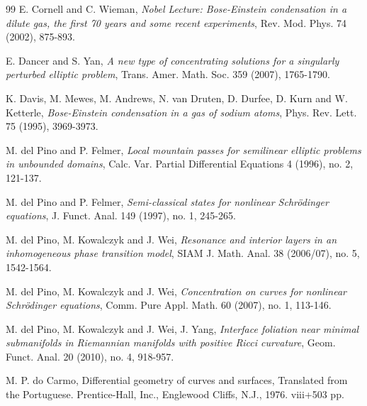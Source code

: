 \documentclass[10pt, reqno]{amsart}
\numberwithin{equation}{section}
\theoremstyle{definition}
\begin{document}
{\begin{thebibliography}{99}
E. Cornell and C. Wieman,
\emph{Nobel Lecture: Bose-Einstein condensation in a dilute gas, the first 70 years and some recent experiments},
Rev. Mod. Phys.
74 (2002), 875-893.



E. Dancer and S. Yan,
\emph{A new type of concentrating solutions for a singularly perturbed elliptic problem},
Trans. Amer. Math. Soc.
359 (2007), 1765-1790.

K. Davis, M. Mewes, M. Andrews, N. van Druten, D. Durfee, D. Kurn and W. Ketterle,
\emph{Bose-Einstein condensation in a gas of sodium atoms},
Phys. Rev. Lett.
75 (1995), 3969-3973.



M. del Pino and P. Felmer,
\emph{Local mountain passes for semilinear elliptic problems in unbounded domains},
Calc. Var. Partial Differential Equations
4 (1996), no. 2, 121-137.




M. del Pino and P. Felmer,
\emph{Semi-classical states for nonlinear Schr\"odinger equations},
J. Funct. Anal.
149 (1997), no. 1, 245-265.




M. del Pino, M. Kowalczyk and J. Wei,
\emph{Resonance and interior layers in an inhomogeneous phase transition model},
SIAM J. Math. Anal. 38 (2006/07), no. 5, 1542-1564.



M. del Pino, M. Kowalczyk and J. Wei,
\emph{Concentration on curves for nonlinear Schr\"odinger equations},
Comm. Pure Appl. Math. {60} (2007), no. 1, 113-146.


M. del Pino, M. Kowalczyk and J. Wei, J. Yang,
\emph{Interface foliation near minimal submanifolds in Riemannian manifolds with positive Ricci curvature},
Geom. Funct. Anal. 20 (2010), no. 4, 918-957.


M. P. do Carmo, Differential geometry of curves and surfaces,
Translated from the Portuguese. Prentice-Hall, Inc., Englewood Cliffs, N.J., 1976. viii+503 pp.


%



\end{thebibliography}}
\end{document}

